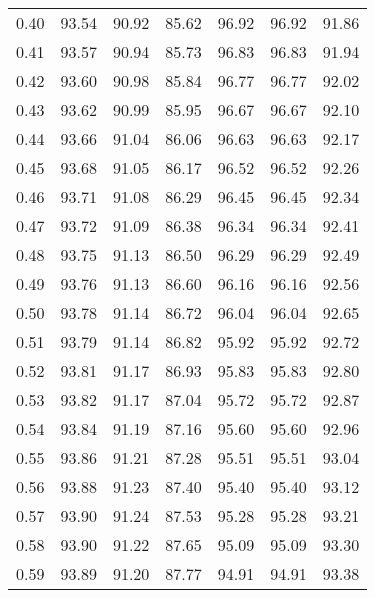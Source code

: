 \begin{tabular}{|c|c|c|c|c|c|c|}
      0.40 &     93.54 &     90.92 &      85.62 &   96.92 &      96.92 &         91.86 \\
      0.41 &     93.57 &     90.94 &      85.73 &   96.83 &      96.83 &         91.94 \\
      0.42 &     93.60 &     90.98 &      85.84 &   96.77 &      96.77 &         92.02 \\
      0.43 &     93.62 &     90.99 &      85.95 &   96.67 &      96.67 &         92.10 \\
      0.44 &     93.66 &     91.04 &      86.06 &   96.63 &      96.63 &         92.17 \\
      0.45 &     93.68 &     91.05 &      86.17 &   96.52 &      96.52 &         92.26 \\
      0.46 &     93.71 &     91.08 &      86.29 &   96.45 &      96.45 &         92.34 \\
      0.47 &     93.72 &     91.09 &      86.38 &   96.34 &      96.34 &         92.41 \\
      0.48 &     93.75 &     91.13 &      86.50 &   96.29 &      96.29 &         92.49 \\
      0.49 &     93.76 &     91.13 &      86.60 &   96.16 &      96.16 &         92.56 \\
      0.50 &     93.78 &     91.14 &      86.72 &   96.04 &      96.04 &         92.65 \\
      0.51 &     93.79 &     91.14 &      86.82 &   95.92 &      95.92 &         92.72 \\
      0.52 &     93.81 &     91.17 &      86.93 &   95.83 &      95.83 &         92.80 \\
      0.53 &     93.82 &     91.17 &      87.04 &   95.72 &      95.72 &         92.87 \\
      0.54 &     93.84 &     91.19 &      87.16 &   95.60 &      95.60 &         92.96 \\
      0.55 &     93.86 &     91.21 &      87.28 &   95.51 &      95.51 &         93.04 \\
      0.56 &     93.88 &     91.23 &      87.40 &   95.40 &      95.40 &         93.12 \\
      0.57 &     93.90 &     91.24 &      87.53 &   95.28 &      95.28 &         93.21 \\
      0.58 &     93.90 &     91.22 &      87.65 &   95.09 &      95.09 &         93.30 \\
      0.59 &     93.89 &     91.20 &      87.77 &   94.91 &      94.91 &         93.38 \\

\end{tabular}
